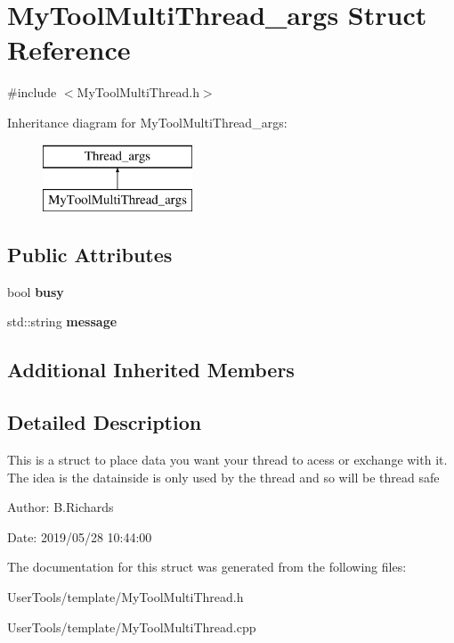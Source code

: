 \hypertarget{structMyToolMultiThread__args}{\section{My\-Tool\-Multi\-Thread\-\_\-args Struct Reference}
\label{structMyToolMultiThread__args}
}


{\ttfamily \#include $<$My\-Tool\-Multi\-Thread.\-h$>$}

Inheritance diagram for My\-Tool\-Multi\-Thread\-\_\-args\-:\begin{figure}[H]
\begin{center}
\leavevmode
\includegraphics[height=2.000000cm]{structMyToolMultiThread__args}
\end{center}
\end{figure}
\subsection*{Public Attributes}
\begin{DoxyCompactItemize}
\item 
\hypertarget{structMyToolMultiThread__args_a25e00c4f60078d432869910f475fff9b}{bool {\bfseries busy}}\label{structMyToolMultiThread__args_a25e00c4f60078d432869910f475fff9b}

\item 
\hypertarget{structMyToolMultiThread__args_a05324a4ea6b7c87b2cc09473ab9027f5}{std\-::string {\bfseries message}}\label{structMyToolMultiThread__args_a05324a4ea6b7c87b2cc09473ab9027f5}

\end{DoxyCompactItemize}
\subsection*{Additional Inherited Members}


\subsection{Detailed Description}
This is a struct to place data you want your thread to acess or exchange with it. The idea is the datainside is only used by the thread and so will be thread safe

\begin{DoxyParagraph}{Author\-:}
B.\-Richards 
\end{DoxyParagraph}
\begin{DoxyParagraph}{Date\-:}
2019/05/28 10\-:44\-:00 
\end{DoxyParagraph}


The documentation for this struct was generated from the following files\-:\begin{DoxyCompactItemize}
\item 
User\-Tools/template/My\-Tool\-Multi\-Thread.\-h\item 
User\-Tools/template/My\-Tool\-Multi\-Thread.\-cpp\end{DoxyCompactItemize}
